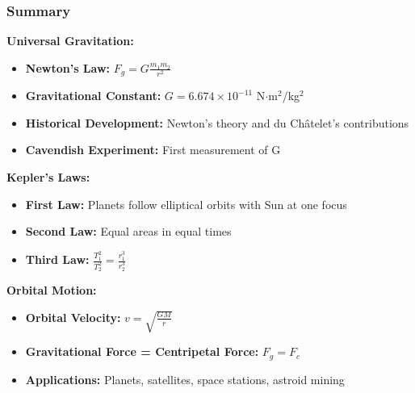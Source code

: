 \documentclass{beamer}
\begin{document}
\begin{frame}
\frametitle{Summary}
\textbf{Universal Gravitation:}
\begin{itemize}
    \item \textbf{Newton's Law:} $F_g = G\frac{m_1m_2}{r^2}$
    \item \textbf{Gravitational Constant:} $G = 6.674 \times 10^{-11}$ N$\cdot$m$^2$/kg$^2$
    \item \textbf{Historical Development:} Newton's theory and du Châtelet's contributions
    \item \textbf{Cavendish Experiment:} First measurement of G
\end{itemize}

\textbf{Kepler's Laws:}
\begin{itemize}
    \item \textbf{First Law:} Planets follow elliptical orbits with Sun at one focus
    \item \textbf{Second Law:} Equal areas in equal times
    \item \textbf{Third Law:} $\frac{T_1^2}{T_2^2} = \frac{r_1^3}{r_2^3}$
\end{itemize}

\textbf{Orbital Motion:}
\begin{itemize}
    \item \textbf{Orbital Velocity:} $v = \sqrt{\frac{GM}{r}}$
    \item \textbf{Gravitational Force = Centripetal Force:} $F_g = F_c$
    \item \textbf{Applications:} Planets, satellites, space stations, astroid mining
\end{itemize}
\end{frame}
\end{document}
